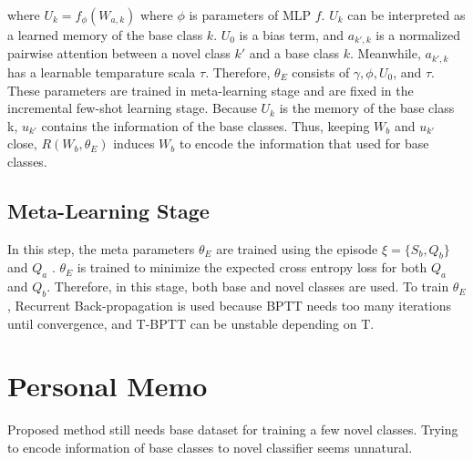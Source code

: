 \documentclass[10pt,twocolumn,letterpaper]{article}
\newcommand{\Qa}{Q_a}
\newcommand{\Qb}{Q_b}
\newcommand{\Sb}{S_b}
\newcommand{\Wb}{W_b}
\begin{document}
where $U_k = f_\phi (W_{a, k})$ where $\phi$ is parameters of MLP  $f$. $U_k$ can be interpreted as a learned memory of the base class $k$. $U_0$ is a bias term, and $a_{k', k}$ is a normalized pairwise attention between a novel class $k'$ and a base class $k$. Meanwhile, $a_{k', k}$ has a learnable temparature scala $\tau$. Therefore, $ \theta_E $ consists of $\gamma, \phi, U_0$, and $ \tau$. These parameters are trained in meta-learning stage and are fixed in the incremental few-shot learning stage. Because $U_k$ is the memory of the base class k, $u_{k'}$ contains the information of the base classes. Thus, keeping $\Wb$ and $u_{k'}$ close, $R(W_b,\theta_E)$ induces $\Wb$ to encode the information that used for base classes.

\subsection{Meta-Learning Stage}\label{meta}
In this step, the meta parameters $ \theta_E $ are trained using the episode $\xi = \{\Sb, \Qb\}$ and $\Qa$ . $ \theta_E $ is trained to minimize the expected cross entropy loss for both $\Qa$ and $\Qb$. Therefore, in this stage, both base and novel classes are used. To train $\theta_{E}$, Recurrent Back-propagation is used because BPTT needs too many iterations until convergence, and T-BPTT can be unstable depending on T.

\section{Personal Memo}
Proposed method still needs base dataset for training a few novel classes. Trying to encode information of base classes to novel classifier seems unnatural.

{\small

}
\end{document}
